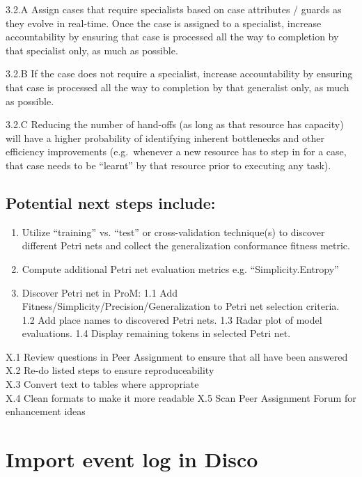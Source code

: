\documentclass[]{article}
\begin{document}
\begin{enumerate}
  3.2.A Assign cases that require specialists based on case attributes /
  guards as they evolve in real-time. Once the case is assigned to a
  specialist, increase accountability by ensuring that case is processed
  all the way to completion by that specialist only, as much as
  possible.

  3.2.B If the case does not require a specialist, increase
  accountability by ensuring that case is processed all the way to
  completion by that generalist only, as much as possible.

  3.2.C Reducing the number of hand-offs (as long as that resource has
  capacity) will have a higher probability of identifying inherent
  bottlenecks and other efficiency improvements (e.g.~whenever a new
  resource has to step in for a case, that case needs to be ``learnt''
  by that resource prior to executing any task).
\end{enumerate}

\subsection{Potential next steps
include:}\label{potential-next-steps-include}

\begin{enumerate}
\def\labelenumi{\arabic{enumi}.}
\item
  Utilize ``training'' vs. ``test'' or cross-validation technique(s) to
  discover different Petri nets and collect the generalization
  conformance fitness metric.
\item
  Compute additional Petri net evaluation metrics e.g.
  ``Simplicity.Entropy''
\item
  Discover Petri net in ProM: 1.1 Add
  Fitness/Simplicity/Precision/Generalization to Petri net selection
  criteria.\\1.2 Add place names to discovered Petri nets. 1.3 Radar
  plot of model evaluations. 1.4 Display remaining tokens in selected
  Petri net.
\end{enumerate}

X.1 Review questions in Peer Assignment to ensure that all have been
answered\\X.2 Re-do listed steps to ensure reproduceability\\X.3 Convert
text to tables where appropriate\\X.4 Clean formats to make it more
readable X.5 Scan Peer Assignment Forum for enhancement ideas

\section{Import event log in Disco}\label{import-event-log-in-disco}
\end{document}
